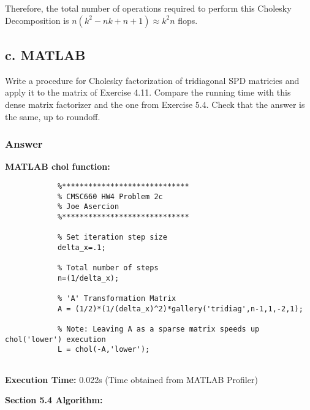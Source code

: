 \documentclass{article}
\newcommand{\n}{\newline}
\begin{document}
		Therefore, the total number of operations required to perform this Cholesky Decomposition is $n(k^{2}-nk+n+1)\approx k^{2}n$ flops.
		
		
		\subsection{c. MATLAB}
		Write a procedure for Cholesky factorization of tridiagonal SPD matricies and apply it to the matrix of Exercise 4.11.  Compare the running time with this dense matrix factorizer and the one from Exercise 5.4.  Check that the answer is the same, up to roundoff.
		
		\newpage
		
		\subsubsection{Answer}
		
		\textbf{MATLAB chol function:\n}
		
		\begin{lstlisting}
			%*****************************
			% CMSC660 HW4 Problem 2c
			% Joe Asercion
			%***************************** 
			
			% Set iteration step size
			delta_x=.1;
			
			% Total number of steps
			n=(1/delta_x);
			
			% 'A' Transformation Matrix
			A = (1/2)*(1/(delta_x)^2)*gallery('tridiag',n-1,1,-2,1);
			
			% Note: Leaving A as a sparse matrix speeds up chol('lower') execution
			L = chol(-A,'lower');
			
		\end{lstlisting}
		
		\begin{flushleft}
		\textbf{Execution Time: } 0.022s
		(Time obtained from MATLAB Profiler)
		\end{flushleft}
		
		\newpage
		
		\textbf{Section 5.4 Algorithm: \n}
		
\end{document}

